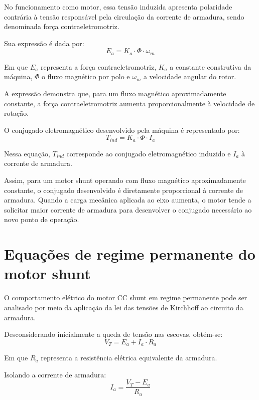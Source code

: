 \documentclass[12pt,openright,oneside,a4paper,brazilian]{abntex2}
\begin{document}
No funcionamento como motor, essa tensão induzida apresenta polaridade contrária à tensão responsável pela circulação da corrente de armadura, sendo denominada força contraeletromotriz.

Sua expressão é dada por:
\begin{equation}
E_a = K_a \cdot \Phi \cdot \omega_m
\label{fcem}
\end{equation}

Em que $E_a$ representa a força contraeletromotriz, $K_a$ a constante construtiva da máquina, $\Phi$ o fluxo magnético por polo e $\omega_m$ a velocidade angular do rotor.

A expressão demonstra que, para um fluxo magnético aproximadamente constante, a força contraeletromotriz aumenta proporcionalmente à velocidade de rotação.

O conjugado eletromagnético desenvolvido pela máquina é representado por:
\begin{equation}
T_{ind} = K_a \cdot \Phi \cdot I_a
\label{conjugado}
\end{equation}

Nessa equação, $T_{ind}$ corresponde ao conjugado eletromagnético induzido e $I_a$ à corrente de armadura.

Assim, para um motor shunt operando com fluxo magnético aproximadamente constante, o conjugado desenvolvido é diretamente proporcional à corrente de armadura. Quando a carga mecânica aplicada ao eixo aumenta, o motor tende a solicitar maior corrente de armadura para desenvolver o conjugado necessário ao novo ponto de operação.

\section{Equações de regime permanente do motor shunt}
O comportamento elétrico do motor CC shunt em regime permanente pode ser analisado por meio da aplicação da lei das tensões de Kirchhoff ao circuito da armadura.

Desconsiderando inicialmente a queda de tensão nas escovas, obtém-se:
\begin{equation}
V_T = E_a + I_a \cdot R_a
\label{tensao_armadura}
\end{equation}

Em que $R_a$ representa a resistência elétrica equivalente da armadura.

Isolando a corrente de armadura:
\begin{equation}
I_a = \frac{V_T - E_a}{R_a}
\label{corrente_armadura}
\end{equation}
\end{document}
